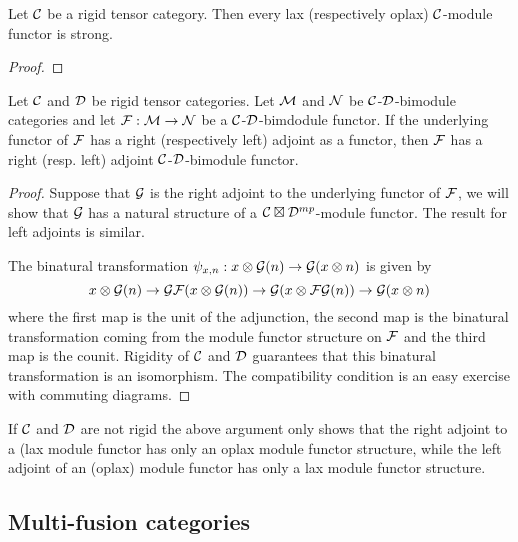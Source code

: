\documentclass{amsart}
\begin{document}
\begin{lemma}
	Let $\mathcal C$ be a rigid tensor category. Then every lax (respectively oplax) $\mathcal C$-module functor is strong.  
\end{lemma}

\begin{proof}
\end{proof}


\begin{lemma} \label{module-adjoint}
Let $\mathcal C$ and $\mathcal D$ be rigid tensor categories. Let  $\mathcal M$ and  $\mathcal N$  be  $\mathcal C$-$\mathcal D$-bimodule categories and let $\mathcal F: \mathcal M \to \mathcal N$ be a $\mathcal C$-$\mathcal D$-bimdodule functor.  If the underlying functor of $\mathcal F$ has a right (respectively left) adjoint as a functor, then $\mathcal F$ has a right (resp. left) adjoint $\mathcal C$-$\mathcal D$-bimodule functor. 
\end{lemma}
\begin{proof}
Suppose that $\mathcal G$ is the right adjoint to the underlying functor of $\mathcal F$, we will show that $\mathcal G$ has a natural structure of a $\mathcal C\boxtimes \mathcal D^{mp}$-module functor.  The result for left adjoints is similar.

The binatural transformation $\psi_{x,n}: x \otimes \mathcal G(n) \rightarrow \mathcal G(x \otimes n)$ is given by
$$x \otimes \mathcal G(n) \rightarrow \mathcal G \mathcal F(x \otimes \mathcal G(n)) \rightarrow \mathcal G(x \otimes \mathcal F\mathcal G(n)) \rightarrow \mathcal G(x \otimes n)$$
where the first map is the unit of the adjunction, the second map is the binatural transformation coming from the module functor structure on $\mathcal F$ and the third map is the counit.  Rigidity of $\mathcal C$ and $\mathcal D$ guarantees that this binatural transformation is an isomorphism.  The compatibility condition is an easy exercise with commuting diagrams.
\end{proof}

\begin{remark}
If $\mathcal C$ and $\mathcal D$ are not rigid the above argument only shows that the right adjoint to a (lax module functor has only an oplax module functor structure, while the left adjoint of an (oplax) module functor has only a lax module functor structure.  
\end{remark}


\subsection{Multi-fusion categories} \label{sec-tc-fusion}

\end{document}
